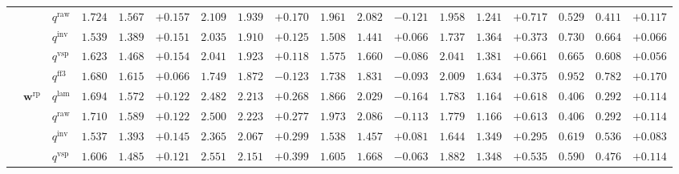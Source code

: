 \documentclass[eng]{kjas3}
\begin{document}
\begin{table}[t]
{\begin{tabular}{lll ccc ccc ccc ccc ccc}
 &  & $q^{\mathrm{raw}}$ & $1.724$ & $1.567$ & \cellcolor{posgreen!50}$+0.157$ & $2.109$ & $1.939$ & \cellcolor{posgreen!50}$+0.170$ & $1.961$ & $2.082$ & \cellcolor{negred!50}$-0.121$ & $1.958$ & $1.241$ & \cellcolor{posgreen!50}$+0.717$ & $0.529$ & $0.411$ & \cellcolor{posgreen!50}$+0.117$ \\
 &  & $q^{\mathrm{inv}}$ & $1.539$ & $1.389$ & \cellcolor{posgreen!50}$+0.151$ & $2.035$ & $1.910$ & \cellcolor{posgreen!50}$+0.125$ & $1.508$ & $1.441$ & \cellcolor{posgreen!50}$+0.066$ & $1.737$ & $1.364$ & \cellcolor{posgreen!50}$+0.373$ & $0.730$ & $0.664$ & \cellcolor{posgreen!50}$+0.066$ \\
 &  & $q^{\mathrm{vsp}}$ & $1.623$ & $1.468$ & \cellcolor{posgreen!50}$+0.154$ & $2.041$ & $1.923$ & \cellcolor{posgreen!50}$+0.118$ & $1.575$ & $1.660$ & \cellcolor{negred!50}$-0.086$ & $2.041$ & $1.381$ & \cellcolor{posgreen!50}$+0.661$ & $0.665$ & $0.608$ & \cellcolor{posgreen!50}$+0.056$ \\
 &  & $q^{\mathrm{ff3}}$ & $1.680$ & $1.615$ & \cellcolor{posgreen!50}$+0.066$ & $1.749$ & $1.872$ & \cellcolor{negred!50}$-0.123$ & $1.738$ & $1.831$ & \cellcolor{negred!50}$-0.093$ & $2.009$ & $1.634$ & \cellcolor{posgreen!50}$+0.375$ & $0.952$ & $0.782$ & \cellcolor{posgreen!50}$+0.170$ \\
\cmidrule(lr){2-18}
 & $\mathbf{w}^{\mathrm{rp}}$ & $q^{\mathrm{lam}}$ & $1.694$ & $1.572$ & \cellcolor{posgreen!50}$+0.122$ & $2.482$ & $2.213$ & \cellcolor{posgreen!50}$+0.268$ & $1.866$ & $2.029$ & \cellcolor{negred!50}$-0.164$ & $1.783$ & $1.164$ & \cellcolor{posgreen!50}$+0.618$ & $0.406$ & $0.292$ & \cellcolor{posgreen!50}$+0.114$ \\
 &  & $q^{\mathrm{raw}}$ & $1.710$ & $1.589$ & \cellcolor{posgreen!50}$+0.122$ & $2.500$ & $2.223$ & \cellcolor{posgreen!50}$+0.277$ & $1.973$ & $2.086$ & \cellcolor{negred!50}$-0.113$ & $1.779$ & $1.166$ & \cellcolor{posgreen!50}$+0.613$ & $0.406$ & $0.292$ & \cellcolor{posgreen!50}$+0.114$ \\
 &  & $q^{\mathrm{inv}}$ & $1.537$ & $1.393$ & \cellcolor{posgreen!50}$+0.145$ & $2.365$ & $2.067$ & \cellcolor{posgreen!50}$+0.299$ & $1.538$ & $1.457$ & \cellcolor{posgreen!50}$+0.081$ & $1.644$ & $1.349$ & \cellcolor{posgreen!50}$+0.295$ & $0.619$ & $0.536$ & \cellcolor{posgreen!50}$+0.083$ \\
 &  & $q^{\mathrm{vsp}}$ & $1.606$ & $1.485$ & \cellcolor{posgreen!50}$+0.121$ & $2.551$ & $2.151$ & \cellcolor{posgreen!50}$+0.399$ & $1.605$ & $1.668$ & \cellcolor{negred!50}$-0.063$ & $1.882$ & $1.348$ & \cellcolor{posgreen!50}$+0.535$ & $0.590$ & $0.476$ & \cellcolor{posgreen!50}$+0.114$ \\

\end{tabular}}
\end{table}
\end{document}
